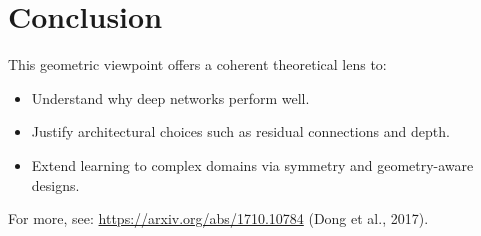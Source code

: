 \documentclass[a4paper,11pt]{article}
\begin{document}
\section*{Conclusion}

This geometric viewpoint offers a coherent theoretical lens to:

\begin{itemize}
    \item Understand why deep networks perform well.
    \item Justify architectural choices such as residual connections and depth.
    \item Extend learning to complex domains via symmetry and geometry-aware designs.
\end{itemize}

\noindent For more, see: \url{https://arxiv.org/abs/1710.10784} (Dong et al., 2017).
\end{document}
